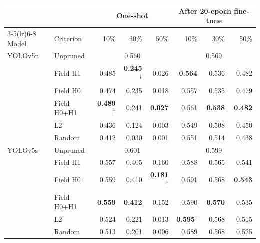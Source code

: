 \begin{tabular}{llrrrrrr}
\toprule
 & & \multicolumn{3}{c}{One-shot} & \multicolumn{3}{c}{After 20-epoch fine-tune} \\
\cmidrule(lr){3-5}\cmidrule(lr){6-8}
Model & Criterion & 10\% & 30\% & 50\% & 10\% & 30\% & 50\% \\
\midrule
YOLOv5n & Unpruned & \multicolumn{3}{c}{0.560} & \multicolumn{3}{c}{0.569} \\
 & Field H1 & 0.485 & \textbf{0.245}$^\dagger$ & 0.026 & \textbf{0.564} & 0.536 & 0.482 \\
 & Field H0 & 0.474 & 0.235 & 0.018 & 0.557 & 0.535 & 0.479 \\
 & Field H0+H1 & \textbf{0.489}$^\dagger$ & 0.241 & \textbf{0.027} & 0.561 & \textbf{0.538} & \textbf{0.482} \\
 & L2 & 0.436 & 0.124 & 0.003 & 0.549 & 0.508 & 0.450 \\
 & Random & 0.412 & 0.030 & 0.001 & 0.551 & 0.514 & 0.438 \\
\midrule
YOLOv5s & Unpruned & \multicolumn{3}{c}{0.601} & \multicolumn{3}{c}{0.599} \\
 & Field H1 & 0.557 & 0.405 & 0.160 & 0.588 & 0.565 & 0.541 \\
 & Field H0 & 0.559 & 0.410 & \textbf{0.181}$^\dagger$ & 0.591 & 0.568 & \textbf{0.543} \\
 & Field H0+H1 & \textbf{0.559} & \textbf{0.412} & 0.152 & 0.590 & \textbf{0.570} & 0.535 \\
 & L2 & 0.524 & 0.221 & 0.013 & \textbf{0.595}$^\dagger$ & 0.568 & 0.515 \\
 & Random & 0.513 & 0.201 & 0.006 & 0.589 & 0.568 & 0.525 \\
\bottomrule
\end{tabular}
